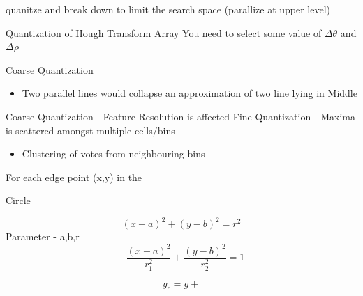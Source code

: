 \documentclass[11pt]{article}
\theoremstyle{definition}
\begin{document}
quanitze and break down to limit the search space (parallize at upper level)


\newpage
\pagestyle{plain}  %

Quantization of Hough Transform Array
You need to select some value of $\Delta\theta$ and $\Delta\rho$

Coarse Quantization
\begin{itemize}
    \item Two parallel lines would collapse an approximation of two line lying in Middle
    
\end{itemize}

Coarse Quantization - Feature Resolution is affected
Fine Quantization - Maxima is scattered amongst multiple cells/bins

\begin{itemize}
    \item Clustering of votes from neighbouring bins
\end{itemize}

For each edge point (x,y) in the 


Circle

\[
(x-a)^2 + (y-b)^2 = r^2
\]
Parameter - a,b,r
\[
-\frac{(x-a)^2}{r_1^2}+\frac{(y-b)^2}{r_2^2} = 1
\]


\[
y_c = g+
\]
\end{document}

